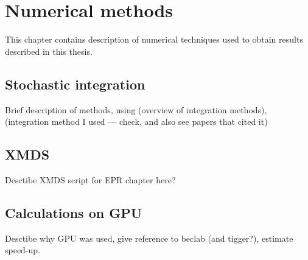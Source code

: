 \chapter{Numerical methods}
\label{cha:appendix:numerical}

This chapter contains description of numerical techniques used to obtain results described in this thesis.


\section{Stochastic integration}

Brief description of methods, using \cite{Werner1997} (overview of integration methods), \cite{Klauder1985} (integration method I used --- check, and also see papers that cited it)


\section{XMDS}

Desctibe XMDS script for EPR chapter here?

\section{Calculations on GPU}

Desctibe why GPU was used, give reference to beclab (and tigger?), estimate speed-up.
